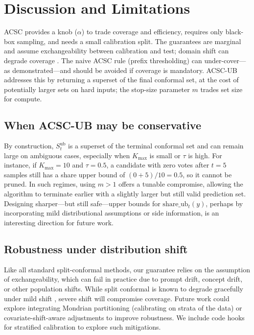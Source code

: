 \documentclass[11pt]{article}
\begin{document}
\section{Discussion and Limitations}
ACSC provides a knob ($\alpha$) to trade coverage and efficiency, requires only black-box sampling,
and needs a small calibration split. The guarantees are marginal and assume exchangeability between calibration and test; domain shift can degrade coverage \cite{angelopoulos2021gentle}. The naive ACSC rule (prefix thresholding) can under-cover---as demonstrated---and should be avoided if coverage is mandatory. ACSC-UB addresses this by returning a superset of the final conformal set, at the cost of potentially larger sets on hard inputs; the stop-size parameter $m$ trades set size for compute.

\subsection{When ACSC-UB may be conservative}
By construction, $S_t^{\text{ub}}$ is a superset of the terminal conformal set and can remain large on ambiguous cases, especially when $K_{\max}$ is small or $\tau$ is high. For instance, if $K_{\max}=10$ and $\tau=0.5$, a candidate with zero votes after $t=5$ samples still has a share upper bound of $(0+5)/10 = 0.5$, so it cannot be pruned. In such regimes, using $m>1$ offers a tunable compromise, allowing the algorithm to terminate earlier with a slightly larger but still valid prediction set. Designing sharper—but still safe—upper bounds for $\text{share\_ub}_t(y)$, perhaps by incorporating mild distributional assumptions or side information, is an interesting direction for future work.

\subsection{Robustness under distribution shift}
Like all standard split-conformal methods, our guarantee relies on the assumption of exchangeability, which can fail in practice due to prompt drift, concept drift, or other population shifts. While split conformal is known to degrade gracefully under mild shift \cite{tibshirani2019conformal, angelopoulos2021gentle}, severe shift will compromise coverage. Future work could explore integrating Mondrian partitioning (calibrating on strata of the data) or covariate-shift-aware adjustments to improve robustness. We include code hooks for stratified calibration to explore such mitigations.
\end{document}
